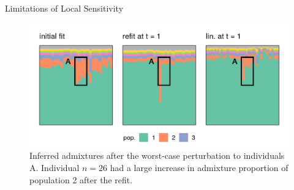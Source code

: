 \begin{frame}{Limitations of Local Sensitivity}
  \begin{figure}[!h]
    \centering
    \includegraphics[width = \textwidth]{./figure/bad_admix_ex-1.png}
    \caption*{Inferred admixtures after the worst-case perturbation
     to individuals A.
     Individual $n = 26$ had a large increase in admixture proportion of
     population 2 after the refit. }
  \end{figure}

\end{frame}

